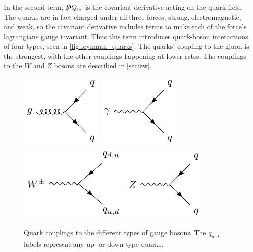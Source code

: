 In the second term, $\slashed{D} Q_m$ is the covariant derivative acting on the quark field. The quarks are in fact charged under all three forces, strong, electromagnetic, and weak, so the covariant derivative includes terms to make each of the force's lagrangians gauge invariant. Thus this term introduces quark-boson interactions of four types, seen in \autoref{fig:feynman_quarks}. The quarks' coupling to the gluon is the strongest, with the other couplings happening at lower rates. The couplings to the $W$ and $Z$ bosons are described in \autoref{sec:ew}.

\begin{centering}
\begin{figure}[!hbt]
\myfloatalign
\includegraphics[width=.45\linewidth]{feynman/quark_strong.pdf}
\includegraphics[width=.45\linewidth]{feynman/quark_em.pdf}
\includegraphics[width=.45\linewidth]{feynman/quark_w.pdf}
\includegraphics[width=.45\linewidth]{feynman/quark_z.pdf}
\caption{Quark couplings to the different types of gauge bosons. The $q_{u,d}$ labels represent any up- or down-type quarks.}
\label{fig:feynman_quarks}
\end{figure}
\end{centering}

